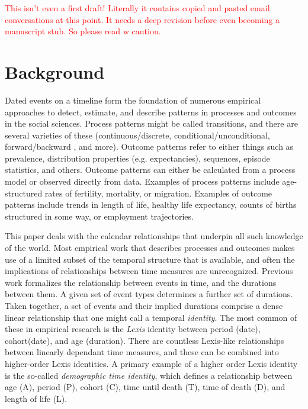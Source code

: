 \textcolor{red}{This isn't even a first draft! Literally it contains copied and pasted email conversations at this point. It needs a deep revision before even becoming a manuscript stub. So please read w caution.}

\section{Background}
Dated events on a timeline form the foundation of numerous empirical approaches to detect, estimate, and describe patterns in processes and outcomes in the social sciences. Process patterns might be called transitions, and there are several varieties of these (continuous/discrete, conditional/unconditional, forward/backward \citep{brouard2019backward}, and more). Outcome patterns refer to either things such as prevalence, distribution properties (e.g. expectancies), sequences, episode statistics, and others. Outcome patterns can either be calculated from a process model or observed directly from data. Examples of process patterns include age-structured rates of fertility, mortality, or migration. Examples of outcome patterns include trends in length of life, healthy life expectancy, counts of births structured in some way, or employment trajectories. 

This paper deals with the calendar relationships that underpin all such knowledge of the world. Most empirical work that describes processes and outcomes makes use of a limited subset of the temporal structure that is available, and often the implications of relationships between time measures are unrecognized. Previous work \citep{riffe2017demographictime} formalizes the relationship between events in time, and the durations between them. A given set of event types determines a further set of durations. Taken together, a set of events and their implied durations comprise a dense linear relationship that one might call a temporal \emph{identity}. The most common of these in empirical research is the \emph{Lexis} identity between period (date), cohort(date), and age (duration). There are countless Lexis-like relationships between linearly dependant time measures, and these can be combined into higher-order Lexis identities. A primary example of a higher order Lexis identity is the so-called \emph{demographic time identity}, which defines a relationship between age (A), period (P), cohort (C), time until death (T), time of death (D), and length of life (L). 

